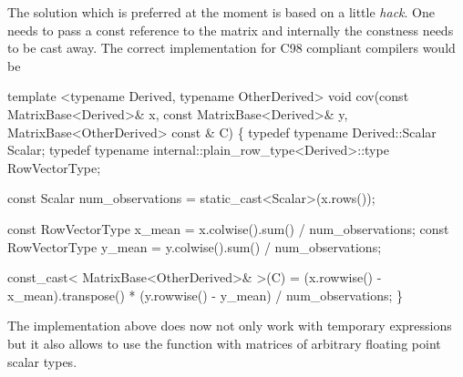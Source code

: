 The solution which is preferred at the moment is based on a little {\itshape hack}. One needs to pass a const reference to the matrix and internally the constness needs to be cast away. The correct implementation for C98 compliant compilers would be 
\begin{DoxyCode}
\textcolor{keyword}{template} <\textcolor{keyword}{typename} Derived, \textcolor{keyword}{typename} OtherDerived>
\textcolor{keywordtype}{void} cov(\textcolor{keyword}{const} MatrixBase<Derived>& x, \textcolor{keyword}{const} MatrixBase<Derived>& y, MatrixBase<OtherDerived> \textcolor{keyword}{const} & C)
\{
  \textcolor{keyword}{typedef} \textcolor{keyword}{typename} Derived::Scalar Scalar;
  \textcolor{keyword}{typedef} \textcolor{keyword}{typename} internal::plain\_row\_type<Derived>::type RowVectorType;

  \textcolor{keyword}{const} Scalar num\_observations = \textcolor{keyword}{static\_cast<}Scalar\textcolor{keyword}{>}(x.rows());

  \textcolor{keyword}{const} RowVectorType x\_mean = x.colwise().sum() / num\_observations;
  \textcolor{keyword}{const} RowVectorType y\_mean = y.colwise().sum() / num\_observations;

  \textcolor{keyword}{const\_cast<} MatrixBase<OtherDerived>& \textcolor{keyword}{>}(C) =
    (x.rowwise() - x\_mean).transpose() * (y.rowwise() - y\_mean) / num\_observations;
\}
\end{DoxyCode}
 The implementation above does now not only work with temporary expressions but it also allows to use the function with matrices of arbitrary floating point scalar types.

